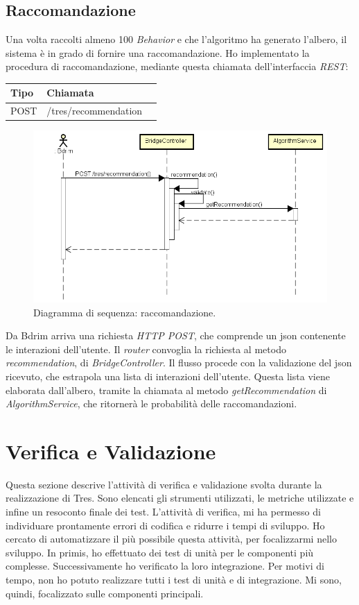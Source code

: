 \subsection{Raccomandazione}
Una volta raccolti almeno 100 \emph{Behavior} e che l'algoritmo ha generato l'albero, il sistema è in grado di fornire una raccomandazione. Ho implementato la procedura di raccomandazione, mediante questa chiamata dell'interfaccia \emph{REST}:
\def\arraystretch{1.5}
\begin{longtable}{|p{2.5cm}|p{5cm}|l|}
\hline
\textbf{Tipo} &	\textbf{Chiamata}	\\\hline
POST	&	/tres/recommendation	 \\\hline
\end{longtable}
\begin{figure}[h]
\centering
\includegraphics[scale=0.42]{immagini/DSracommandazione}
\caption{Diagramma di sequenza: raccomandazione.}
\label{fig:get-recommendation}
\end{figure}
Da Bdrim arriva una richiesta \emph{HTTP POST}, che comprende un \gls{json} contenente le interazioni dell'utente. Il \emph{router} convoglia la richiesta al metodo \emph{recommendation}, di \emph{BridgeController}. Il flusso procede con la validazione del \gls{json} ricevuto, che estrapola una lista di interazioni dell'utente. Questa lista viene elaborata dall'albero, tramite la chiamata al metodo \emph{getRecommendation} di \emph{AlgorithmService}, che ritornerà le probabilità delle raccomandazioni. 




\newpage
\section{Verifica e Validazione}
Questa sezione descrive l'attività di verifica e validazione svolta durante la realizzazione di Tres. Sono elencati gli strumenti utilizzati, le metriche utilizzate e infine un resoconto finale dei test. L'attività di verifica, mi ha permesso di individuare prontamente errori di codifica e ridurre i tempi di sviluppo. Ho cercato di automatizzare il più possibile questa attività, per focalizzarmi nello sviluppo. In primis, ho effettuato dei test di unità per le componenti più complesse. Successivamente ho verificato la loro integrazione. Per motivi di tempo, non ho potuto realizzare tutti i test di unità e di integrazione. Mi sono, quindi, focalizzato sulle componenti principali. 
